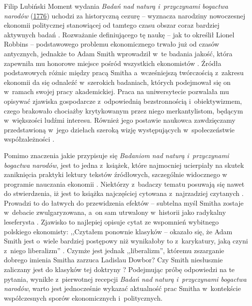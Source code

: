 \begin{artplenv}{Filip Lubiński}
Moment wydania \textit{Badań nad naturą i~przyczynami bogactwa narodów} (\hyperlink{smith-bib}{1776}) uchodzi za historyczną
cezurę -- wyznacza narodziny nowoczesnej ekonomii politycznej stanowiącej od tamtego czasu obszar coraz bardziej aktywnych badań
\parencite[s.~199]{broadie_history_2009}.
Rozważanie definiującego tę naukę -- jak to określił Lionel
Robbins -- podstawowego problemu ekonomicznego
\parencite[s.~15]{robbins_essay_1932}
trwało już od czasów antycznych,
jednakże to Adam Smith wprowadził w~te badania jakość, która zapewniła mu honorowe miejsce pośród wszystkich
ekonomistów
\parencite[s.~XII]{gordon_economic_1975}.
Źródła podstawowych różnic między pracą
Smitha a~wcześniejszą twórczością z~zakresu ekonomii da się odnaleźć w~szerokich badaniach, których podejmował się on w~ramach
swojej pracy akademickiej. Praca na uniwersytecie pozwalała mu opisywać zjawiska gospodarcze z~odpowiednią
bezstronnością i~obiektywizmem, czego brakowało chociażby krytykowanym przez niego merkantylistom,
będącym w~większości ludźmi interesu. Również jego postawie naukowca zawdzięczamy
przedstawioną w~jego dziełach szeroką wizję występujących w~społeczeństwie współzależności
\parencite[s.~111–112]{landreth_historia_1998}.

Pomimo znaczenia jakie przypisuje się \textit{Badaniom nad naturą i~przyczynami bogactwa narodów}, jest to
jedna z~książek, które najmocniej ucierpiały na skutek zaniknięcia praktyki lektury tekstów źródłowych, szczególnie widocznego
w programie nauczania ekonomii
\parencite[s.~58]{blaug_teoria_1994}.
Niektórzy z~badaczy tematu posuwają się
nawet do stwierdzenia, iż jest to książka najczęściej cytowana z~najrzadziej czytanych
\parencite[s.~67]{heilbroner_worldly_1999}.
Prowadzi to do łatwych do przewidzenia efektów -- subtelna myśl
Smitha zostaje w~debacie zwulgaryzowana, a~on sam utrwalony w~historii jako radykalny leseferysta
\parencites[s.~16–17]{skousen_big_2007}[s.~152]{landreth_historia_1998}[s.~261]{rasmussen_pragmatic_2014}.
Zjawisko
to najlepiej opisuje cytat ze wspomnień wybitnego polskiego ekonomisty: ,,Czytałem ponownie klasyków -- okazało się, że
Adam Smith jest o~wiele bardziej postępowy niż wynikałoby to z~karykatury, jaką czyni z~niego
liberalizm''
\parencite[s.~39]{dowbor_rozbita_2005}.
Czymże jest jednak
,,liberalizm'', któremu zszarganie dobrego imienia Smitha zarzuca Ladislau Dowbor? Czy Smith niesłusznie zaliczany jest
do klasyków tej doktryny
\parencite[s.~38]{gray_liberalizm_1994}?
Podejmując próbę odpowiedzi na te pytania,
wynikłe z~pierwotnej recepcji \textit{Badań nad naturą i~przyczynami bogactwa narodów}, warto jest jednocześnie wykazać
aktualność prac Smitha w~kontekście współczesnych sporów ekonomicznych i~politycznych.


\end{artplenv}
